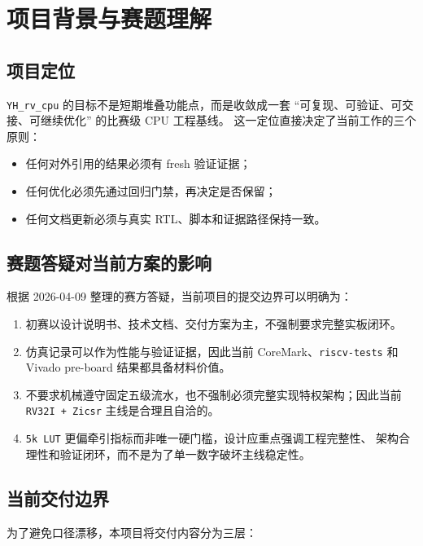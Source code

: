 \section{项目背景与赛题理解}

\subsection{项目定位}

\texttt{YH\_rv\_cpu} 的目标不是短期堆叠功能点，而是收敛成一套
``可复现、可验证、可交接、可继续优化'' 的比赛级 CPU 工程基线。
这一定位直接决定了当前工作的三个原则：

\begin{itemize}
    \item 任何对外引用的结果必须有 fresh 验证证据；
    \item 任何优化必须先通过回归门禁，再决定是否保留；
    \item 任何文档更新必须与真实 RTL、脚本和证据路径保持一致。
\end{itemize}

\subsection{赛题答疑对当前方案的影响}

根据 2026-04-09 整理的赛方答疑，当前项目的提交边界可以明确为：

\begin{enumerate}
    \item 初赛以设计说明书、技术文档、交付方案为主，不强制要求完整实板闭环。
    \item 仿真记录可以作为性能与验证证据，因此当前 CoreMark、\texttt{riscv-tests} 和
    Vivado pre-board 结果都具备材料价值。
    \item 不要求机械遵守固定五级流水，也不强制必须完整实现特权架构；因此当前
    \texttt{RV32I + Zicsr} 主线是合理且自洽的。
    \item \texttt{5k LUT} 更偏牵引指标而非唯一硬门槛，设计应重点强调工程完整性、
    架构合理性和验证闭环，而不是为了单一数字破坏主线稳定性。
\end{enumerate}

\subsection{当前交付边界}

为了避免口径漂移，本项目将交付内容分为三层：

